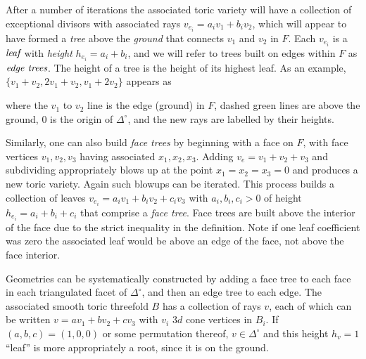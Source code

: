 \documentclass[aps,prl,twocolumn, superscriptaddress,groupedaddress,nofootinbib]{revtex4-1}
\begin{document}
After a number of iterations the associated toric variety will have a
collection of exceptional divisors with associated rays $v_{e_i}=a_i v_1 + b_i
v_2$, which will appear to have formed a \emph{tree} above the \emph{ground}
that connects $v_1$ and $v_2$ in $F$. Each $v_{e_i}$ is a $\emph{leaf}$ with
\emph{height} $h_{e_i}=a_i+b_i$, and  we will refer to trees built on edges
within $F$ as $\emph{edge trees}$. The height of a tree is the height of its
highest leaf. As an example, $\{v_1+v_2,2v_1+v_2,v_1+2v_2\}$ appears as
\begin{center}  \end{center} where the $v_1$ to $v_2$ line is the
edge (ground) in $F$, dashed green lines are above the ground, $0$ is the origin of $\Delta^\circ$, and the new rays
are labelled by their heights.

Similarly, one can also build \emph{face trees} by beginning with a face on
$F$, with face vertices $v_1, v_2, v_3$ having associated $x_1, x_2, x_3$. Adding $v_e=v_1+v_2+v_3$ and subdividing
appropriately blows up at the point $x_1=x_2=x_3=0$  and produces a new toric
variety. Again such blowups can be iterated. This process builds a collection
of leaves $v_{e_i}=a_i v_1 + b_i v_2 + c_i v_3$ with $a_i,b_i,c_i > 0$ of
height $h_{e_i}=a_i+b_i+c_i$ that comprise a \emph{face tree}. Face trees are
built above the interior of the face due to the strict inequality in the
definition. Note if one leaf coefficient was zero the associated leaf would be
above an edge of the face, not above the face interior.

Geometries can be systematically constructed by adding a face tree to each face in each triangulated facet of $\Delta^\circ$, and then an edge tree to each edge. The associated smooth toric
threefold $B$ has a collection of rays $v$, each of which can be written $v=av_1+bv_2+cv_3$ with $v_i$ $3d$ cone vertices in $B_i$. If $(a,b,c)=(1,0,0)$ or some
permutation thereof, $v\in \Delta^\circ$ and this height $h_v=1$ ``leaf'' is more
appropriately a root, since it is on the ground.
\end{document}
